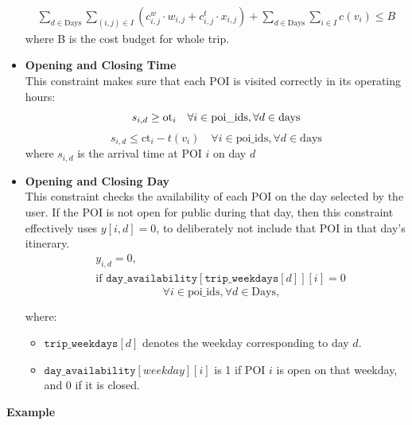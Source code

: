 \documentclass[sigconf,authordraft]{acmart}
\begin{document}
\begin{itemize}
\begin{align}
\label{mul_day_25}
\sum_{d \in \text{Days}} \sum_{(i,j) \in I} \left(c^{w}_{i,j} \cdot w_{i,j} + c^{t}_{i,j} \cdot x_{i,j} \right) + \sum_{d \in \text{Days}} \sum_{i \in I} c(v_i) \leq B 
\end{align}
where B is the cost budget for whole trip.
\\[1ex]
\item \textbf{Opening and Closing Time}\\
    This constraint makes sure that each POI is visited correctly in its operating hours:
    \begin{equation}
    \label{mul_day_29}
    s_{i,d} \geq \text{ot}_i \quad \forall i \in \text{{poi\_ids}}, \forall d \in \text{days} \\
    \end{equation}
    \begin{equation}
    \label{mul_day_30}
        s_{i,d} \leq \text{ct}_i - t(v_i) \quad \forall i \in \text{{poi\_ids}}, \forall d \in \text{days}
    \end{equation}
    \noindent
    where \( s_{i,d} \) is the arrival time at POI \( i \) on day \( d \)
\\[1ex]
\item \textbf{Opening and Closing Day}\\
    This constraint checks the availability of each POI on the day selected by the user. If the POI is not open for public during that day, then this constraint effectively uses $y[i, d] = 0$, to deliberately not include that POI in that day's itinerary.
    \begin{align}
\label{mul_day_31}
& y_{i,d} = 0, \\
&\text{if } \texttt{day\_availability}[\texttt{trip\_weekdays}[d]][i] = 0 \nonumber
\end{align}
    \[\quad \forall i \in \text{{poi\_ids}}, \forall d \in \text{Days},\]
  
    \noindent
    where:
    \begin{itemize}
        \item \( \texttt{trip\_weekdays}[d] \) denotes the weekday corresponding to day \( d \).
        \item \( \texttt{day\_availability}[weekday][i] \) is 1 if POI \( i \) is open on that weekday, and 0 if it is closed.
    \end{itemize}
\end{itemize}

\textbf{Example}
\end{document}

